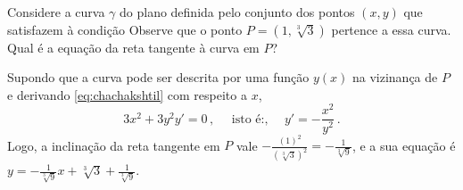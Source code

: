 \begin{ex}
Considere a curva $\gamma$ do plano definida pelo conjunto dos pontos $(x,y)$
que satisfazem à condição
Observe que o ponto $P=(1,\sqrt[3]{3})$ pertence a essa curva. Qual é a equação
da reta tangente à curva em $P$?
\begin{center}
\begin{bmlimage}\end{bmlimage}
\end{center}

Supondo que a curva pode ser descrita por uma função $y(x)$ na vizinança de
$P$ e derivando \eqref{eq:chachakshtil} com respeito a $x$,
$$3x^2+3y^2y'=0\,,\quad \text{ isto é:, }\quad
y'=-\frac{x^2}{y^2}\,.$$
Logo, a inclinação da reta tangente em $P$ vale
$-\frac{(1)^2}{(\sqrt[3]{3})^2}=-\tfrac{1}{\sqrt[3]{9}}$, e
a sua equação é
$y=-\tfrac{1}{\sqrt[3]{9}}x+\sqrt[3]{3}+\frac{1}{\sqrt[3]{9}}$.
\end{ex}


